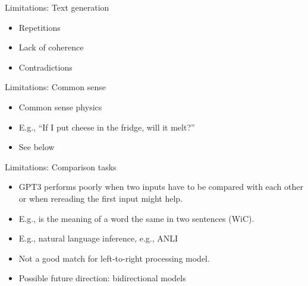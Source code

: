 
\begin{frame}{Limitations: Text generation}

\vfill

  \begin{itemize}
\item Repetitions
\item Lack of coherence
\item Contradictions
    \end{itemize}

\vfill

\end{frame}


\begin{frame}{Limitations: Common sense}

\vfill

  \begin{itemize}
\item Common sense physics
\item E.g., ``If I put cheese in the fridge, will it melt?''
\item See below
    \end{itemize}

\vfill

\end{frame}


\begin{frame}{Limitations: Comparison tasks}

\vfill
			
  \begin{itemize}
\item GPT3 performs poorly when two inputs have to be
compared with each other or when rereading the first input
might help.
\item E.g., is the meaning of a word the same in two
sentences (WiC).
\item E.g., natural language inference, e.g., ANLI
\item Not a good match for left-to-right processing model.
\item Possible future direction: bidirectional models
    \end{itemize}

\vfill

\end{frame}

